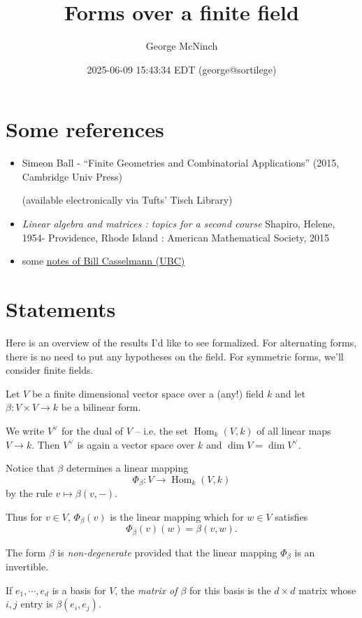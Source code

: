 \documentclass[11pt]{article}
\author{George McNinch}
\date{2025-06-09 15:43:34 EDT (george@sortilege)}
\title{Forms over a finite field}
\numberwithin{equation}{section}
\newcommand{\Hom}{\operatorname{Hom}}
\begin{document}
\maketitle
\section{Some references}
\label{sec:org677c2dd}

\begin{itemize}
\item Simeon Ball - ``Finite Geometries and Combinatorial Applications'' (2015, Cambridge Univ Press)

(available electronically via Tufts' Tisch Library)

\item \emph{Linear algebra and matrices : topics for a second course}
Shapiro, Helene, 1954-
Providence, Rhode Island : American Mathematical Society, 2015

\item some \href{https://personal.math.ubc.ca/\~cass/siegel/FiniteFields.pdf}{notes of Bill Casselmann (UBC)}
\end{itemize}
\section{Statements}
\label{sec:org2983188}

Here is an overview of the results I'd like to see formalized. For
alternating forms, there is no need to put any hypotheses on the
field. For symmetric forms, we'll consider finite fields.


Let \(V\) be a finite dimensional vector space over a (any!) field
\(k\) and let \(\beta:V \times V \to k\) be a bilinear form.

We write \(V^\vee\) for the dual of \(V\) -- i.e. the set
\(\Hom_k(V,k)\) of all linear maps \(V \to k\).  Then \(V^\vee\) is
again a vector space over \(k\) and \(\dim V = \dim V^\vee.\)

Notice that \(\beta\) determines a linear mapping
\[\Phi_\beta:V \to \Hom_k(V,k)\] by the rule
\(v \mapsto \beta(v,-).\)

Thus for \(v \in V\), \(\Phi_\beta(v)\) is the linear mapping which for \(w\in V\) satisfies
\[\Phi_\beta(v)(w) = \beta(v,w).\]

The form \(\beta\) is \emph{non-degenerate} provided that the linear mapping
\(\Phi_\beta\) is an invertible.

If \(e_1,\cdots,e_d\) is a basis for \(V\), the \emph{matrix of \(\beta\)}
for this basis is the \(d \times d\) matrix whose \(i,j\) entry is
\(\beta(e_i,e_j)\).
\end{document}
